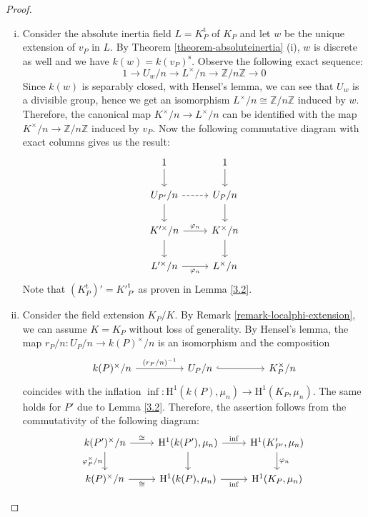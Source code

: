 \begin{proof}
\begin{enumerate}[(i)]
\item Consider the absolute inertia field $L = K_P^\text{t}$ of $K_P$ and let $w$ be the unique extension of $v_P$ in $L$. By Theorem \ref{theorem-absoluteinertia} (i), $w$ is discrete as well and we have $k(w) = k(v_P)^\text{s}$. Observe the following exact sequence:
\[ 1 \longrightarrow U_w/n \longrightarrow L^\times /n\longrightarrow \mathbb{Z}/n\mathbb{Z}\longrightarrow 0 \]
Since $k(w)$ is separably closed, with Hensel's lemma, we can see that $U_w$ is a divisible group, hence we get an isomorphism $L^\times /n\cong \mathbb{Z}/n\mathbb{Z}$ induced by $w$. Therefore, the canonical map $K^\times/n\to L^\times/n$ can be identified with the map $K^\times/n \to\mathbb{Z}/n\mathbb{Z}$ induced by $v_P$. Now the following commutative diagram with exact columns gives us the result:
\[ \begin{tikzcd}
1 \ar[d] & 1 \ar[d]\\
U_{P'}/n \ar[r, dashed]\ar[d] & U_P/n\ar[d]\\
K'^\times /n \ar[r, "\varphi_n"]\ar[d] & K^\times/n\ar[d]\\
L'^\times /n \ar[r, "\varphi_n"'] &  L^\times /n
\end{tikzcd}\]
Note that $(K^\text{t}_P)' = K'^{\text{t}}_{P'}$ as proven in Lemma \ref{3.2}.
\item Consider the field extension $K_P/K$. By Remark \ref{remark-localphi-extension}, we can assume $K=K_P$ without loss of generality. By Hensel's lemma, the map $r_P/n: U_P/n\to k(P)^\times/n$ is an isomorphism and the composition
\[\begin{tikzcd}
k(P)^\times / n\ar[rr, "(r_P/n)^{-1}"] && U_P/n \ar[rr, hook] && K_P^\times/n
\end{tikzcd}\]
coincides with the inflation $\operatorname{inf}: \mathrm{H}^1(k(P), \mu_n) \to \mathrm{H}^1(K_P,\mu_n)$. The same holds for $P'$ due to Lemma \ref{3.2}. Therefore, the assertion follows from the commutativity of the following diagram:
\[ \begin{tikzcd}
k(P')^\times/n \ar[r, "\cong"] \ar[d, "\varphi_P^\times/n"'] & \mathrm{H}^1(k(P'),\mu_n) \ar[r, "\mathrm{inf}"] \ar[d]& \mathrm{H}^1(K'_{P'}, \mu_n) \ar[d, "\varphi_n"] \\
k(P)^\times/n \ar[r, "\cong"'] & \mathrm{H}^1(k(P),\mu_n)  \ar[r, "\mathrm{inf}"'] & \mathrm{H}^1(K_{P}, \mu_n)
\end{tikzcd}  \qedhere\]
\end{enumerate}
\end{proof}

